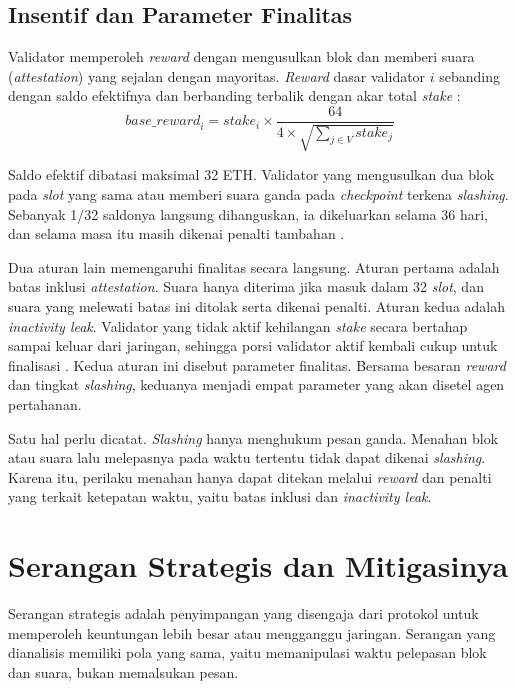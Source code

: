 \subsection{Insentif dan Parameter Finalitas}
\label{subsec:insentif}
Validator memperoleh \textit{reward} dengan mengusulkan blok dan memberi suara (\textit{attestation}) yang sejalan dengan mayoritas. \textit{Reward} dasar validator $i$ sebanding dengan saldo efektifnya dan berbanding terbalik dengan akar total \textit{stake} \parencite{laneve2025stochastic}:
\begin{equation}
\textit{base\_reward}_i = \textit{stake}_i \times \frac{64}{4 \times \sqrt{\sum_{j \in V} \textit{stake}_j}}
\label{eq:base_reward}
\end{equation}

Saldo efektif dibatasi maksimal 32 ETH. Validator yang mengusulkan dua blok pada \textit{slot} yang sama atau memberi suara ganda pada \textit{checkpoint} terkena \textit{slashing}. Sebanyak 1/32 saldonya langsung dihanguskan, ia dikeluarkan selama 36 hari, dan selama masa itu masih dikenai penalti tambahan \parencite{laneve2025stochastic}.

Dua aturan lain memengaruhi finalitas secara langsung. Aturan pertama adalah batas inklusi \textit{attestation}. Suara hanya diterima jika masuk dalam 32 \textit{slot}, dan suara yang melewati batas ini ditolak serta dikenai penalti. Aturan kedua adalah \textit{inactivity leak}. Validator yang tidak aktif kehilangan \textit{stake} secara bertahap sampai keluar dari jaringan, sehingga porsi validator aktif kembali cukup untuk finalisasi \parencite{laneve2025stochastic}. Kedua aturan ini disebut parameter finalitas. Bersama besaran \textit{reward} dan tingkat \textit{slashing}, keduanya menjadi empat parameter yang akan disetel agen pertahanan.

Satu hal perlu dicatat. \textit{Slashing} hanya menghukum pesan ganda. Menahan blok atau suara lalu melepasnya pada waktu tertentu tidak dapat dikenai \textit{slashing}. Karena itu, perilaku menahan hanya dapat ditekan melalui \textit{reward} dan penalti yang terkait ketepatan waktu, yaitu batas inklusi dan \textit{inactivity leak}.

\section{Serangan Strategis dan Mitigasinya}
\label{sec:serangan}
Serangan strategis adalah penyimpangan yang disengaja dari protokol untuk memperoleh keuntungan lebih besar atau mengganggu jaringan. Serangan yang dianalisis \textcite{laneve2025stochastic} memiliki pola yang sama, yaitu memanipulasi waktu pelepasan blok dan suara, bukan memalsukan pesan.


